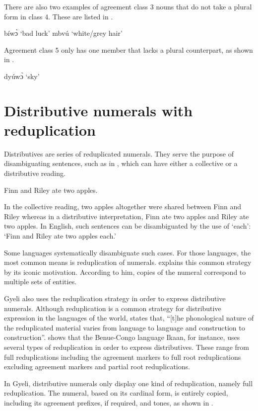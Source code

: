 \noindent There are also two examples of agreement class 3 nouns that do not take a plural form in class 4. These are listed in .

\ea\label{3/0}
\ea bíwɔ̀ `bad luck'
\ex mbvú `white/grey hair'
\z
\z

\noindent Agreement class 5 only has one member that lacks a plural counterpart, as shown in .

\ea\label{5/0}
 dyúwɔ̀ `sky'
\z


\section{Distributive numerals with reduplication} 
\label{sec:Distr}

Distributives are series of reduplicated numerals. They serve the purpose of disambiguating sentences, such as in , which can have either a collective or a distributive reading.

\ea\label{Distr}
 Finn and Riley ate two apples.
\z

\noindent In the collective reading, two apples altogether were shared between Finn and Riley whereas in a distributive interpretation, Finn ate two apples and Riley ate two apples. In English, such sentences can be disambiguated by the use of `each': `Finn and Riley ate two apples each.'

Some languages systematically disambiguate such cases. For those languages, the most common means is reduplication of numerals. \citet{gil13} explains this common strategy by its iconic motivation. According to him, copies of the numeral correspond to multiple sets of entities.

Gyeli also uses the reduplication strategy in order to express distributive numerals. Although reduplication is a common strategy for distributive expression in the languages of the world, \citet{rubino13} states that, ``[t]he phonological nature of the reduplicated material varies from language to language and construction to construction''.   \citet[118]{borchardt11} shows that the Benue-Congo language Ikaan, for instance, uses several types of reduplication in order to express distributives. These range from full reduplications including the agreement markers to full root reduplications excluding agreement markers and partial root reduplications. 

In Gyeli, distributive numerals only display one kind of reduplication, namely full reduplication. The numeral, based on its cardinal form, is entirely copied, including its agreement prefixes, if required, and tones, as shown in .

